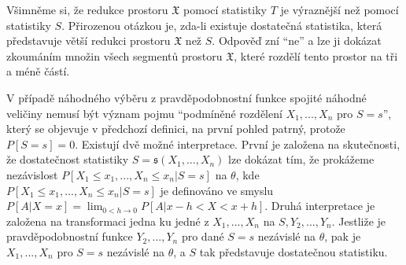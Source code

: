 \begin{example}
Všimněme si, že redukce prostoru $\mathfrak{X}$ pomocí statistiky $T$ je výraznější než pomocí statistiky $S$. Přirozenou otázkou je, zda-li existuje dostatečná statistika, která představuje větší redukci prostoru $\mathfrak{X}$ než $S$. Odpověď zní ``ne'' a lze ji dokázat zkoumáním množin všech segmentů prostoru $\mathfrak{X}$, které rozdělí tento prostor na tři a méně částí.
\end{example}

V případě náhodného výběru z pravděpodobnostní funkce spojité náhodné veličiny nemusí být význam pojmu ``podmíněné rozdělení $X_1, ..., X_n$ pro $S = s$'', který se objevuje v předchozí definici, na první pohled patrný, protože $P[S = s] = 0$. Existují dvě možné interpretace. První je založena na skutečnosti, že dostatečnost statistiky $S = \mathfrak{s}(X_1, ..., X_n)$ lze dokázat tím, že prokážeme nezávislost $P[X_1 \le x_1, ..., X_n \le x_n | S = s]$ na $\theta$, kde $P[X_1 \le x_1, ..., X_n \le x_n | S = s]$ je definováno ve smyslu $P[A|X = x] = \lim_{0 < h \rightarrow 0}P[A|x - h < X < x + h]$. Druhá interpretace je založena na transformaci jedna ku jedné z $X_1, ..., X_n$ na $S, Y_2, ..., Y_n$. Jestliže je pravděpodobnostní funkce $Y_2, ..., Y_n$ pro dané $S = s$ nezávislé na $\theta$, pak je $X_1, ..., X_n$ pro $S = s$ nezávislé na $\theta$, a $S$ tak představuje dostatečnou statistiku.


